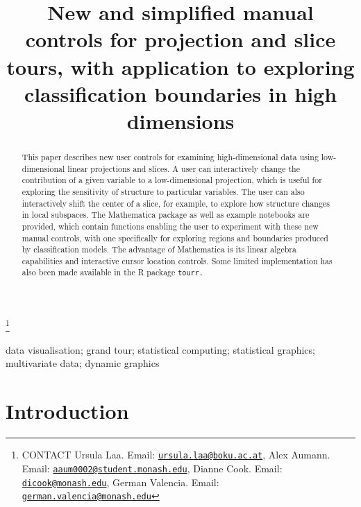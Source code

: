 \documentclass[]{interact}
\theoremstyle{plain}%
\theoremstyle{definition}
\theoremstyle{remark}
\begin{document}

\title{New and simplified manual controls for projection and slice
tours, with application to exploring classification boundaries in high
dimensions}


\author{
}

\thanks{CONTACT Ursula
Laa. Email: \href{mailto:ursula.laa@boku.ac.at}{\nolinkurl{ursula.laa@boku.ac.at}}, Alex
Aumann. Email: \href{mailto:aaum0002@student.monash.edu}{\nolinkurl{aaum0002@student.monash.edu}}, Dianne
Cook. Email: \href{mailto:dicook@monash.edu}{\nolinkurl{dicook@monash.edu}}, German
Valencia. Email: \href{mailto:german.valencia@monash.edu}{\nolinkurl{german.valencia@monash.edu}}}

\maketitle

\begin{abstract}
This paper describes new user controls for examining high-dimensional
data using low-dimensional linear projections and slices. A user can
interactively change the contribution of a given variable to a
low-dimensional projection, which is useful for exploring the
sensitivity of structure to particular variables. The user can also
interactively shift the center of a slice, for example, to explore how
structure changes in local subspaces. The Mathematica package as well as
example notebooks are provided, which contain functions enabling the
user to experiment with these new manual controls, with one specifically
for exploring regions and boundaries produced by classification models.
The advantage of Mathematica is its linear algebra capabilities and
interactive cursor location controls. Some limited implementation has
also been made available in the R package \tt{tourr}. 
\end{abstract}

\begin{keywords}
data visualisation; grand tour; statistical computing; statistical
graphics; multivariate data; dynamic graphics
\end{keywords}

\hypertarget{introduction}{%
\section{Introduction}\label{introduction}}
\end{document}

